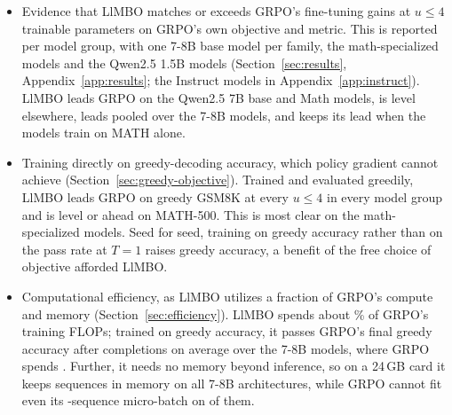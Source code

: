 \documentclass[twoside]{article}
\newcommand{\llmbo}{LlMBO}
\begin{document}
\begin{itemize}
    \item Evidence that \llmbo{} matches or exceeds GRPO's fine-tuning gains at $u \le 4$ trainable parameters on GRPO's own objective and metric. This is reported per model group, with one 7-8B base model per family, the math-specialized models and the Qwen2.5 1.5B models (Section~\ref{sec:results}, Appendix~\ref{app:results}; the Instruct models in Appendix~\ref{app:instruct}). \llmbo{} leads GRPO on the Qwen2.5 7B base and Math models, is level elsewhere, leads pooled over the 7-8B models, and keeps its lead when the models train on MATH alone.
    \item Training directly on greedy-decoding accuracy, which policy gradient cannot achieve (Section~\ref{sec:greedy-objective}). Trained and evaluated greedily, \llmbo{} leads GRPO on greedy GSM8K at every $u \le 4$ in every model group and is level or ahead on MATH-500. This is most clear on the math-specialized models. Seed for seed, training on greedy accuracy rather than on the pass rate at $T = 1$ raises greedy accuracy, a benefit of the free choice of objective afforded \llmbo{}.
    \item Computational efficiency, as \llmbo{} utilizes a fraction of GRPO's compute and memory (Section~\ref{sec:efficiency}). \llmbo{} spends about \boComputeShare{}\% of GRPO's training FLOPs; trained on greedy accuracy, it passes GRPO's final greedy accuracy after \reachPoolGreedyGsm{} completions on average over the 7-8B models, where GRPO spends \grpoCompletions{}. Further, it needs no memory beyond inference, so on a 24\,GB card it keeps \boSequencesSmallCard{} sequences in memory on all 7-8B architectures, while GRPO cannot fit even its \grpoMicroBatch{}-sequence micro-batch on \grpoNoFitSmallCard{} of them.
\end{itemize}
\end{document}
